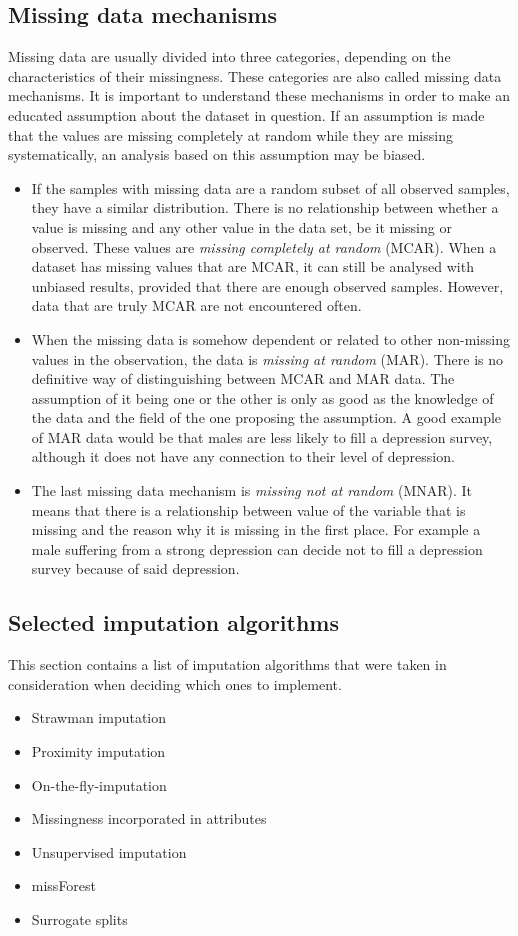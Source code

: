 \documentclass[11pt]{article}
\begin{document}
    \subsection{Missing data mechanisms}
      Missing data are usually divided into three categories, depending on the characteristics of their missingness. These categories are also called missing data mechanisms. \citep{lwd} It is important to understand these mechanisms in order to make an educated assumption about the dataset in question. If an assumption is made that the values are missing completely at random while they are missing systematically, an analysis based on this assumption may be biased.
      \begin{itemize}
      \item If the samples with missing data are a random subset of all observed samples, they have a similar distribution. There is no relationship between whether a value is missing and any other value in the data set, be it missing or observed. These values are {\it missing completely at random} (MCAR). \citep{lwd} When a dataset has missing values that are MCAR, it can still be analysed with unbiased results, provided that there are enough observed samples. However, data that are truly MCAR are not encountered often.
      \item When the missing data is somehow dependent or related to other non-missing values in the observation, the data is {\it missing at random} (MAR). \citep{lwd} There is no definitive way of distinguishing between MCAR and MAR data. The assumption of it being one or the other is only as good as the knowledge of the data and the field of the one proposing the assumption. A good example of MAR data would be that males are less likely to fill a depression survey, although it does not have any connection to their level of depression.
      \item The last missing data mechanism is {\it missing not at random} (MNAR). It means that there is a relationship between value of the variable that is missing and the reason why it is missing in the first place. For example a male suffering from a strong depression can decide not to fill a depression survey because of said depression.
      \end{itemize}
    \subsection{Selected imputation algorithms}
      This section contains a list of imputation algorithms that were taken in consideration when deciding which ones to implement.
      \begin{itemize}
      \item Strawman imputation
      \item Proximity imputation
      \item On-the-fly-imputation
      \item Missingness incorporated in attributes
      \item Unsupervised imputation
      \item missForest
      \item Surrogate splits
      \end{itemize}
\end{document}
